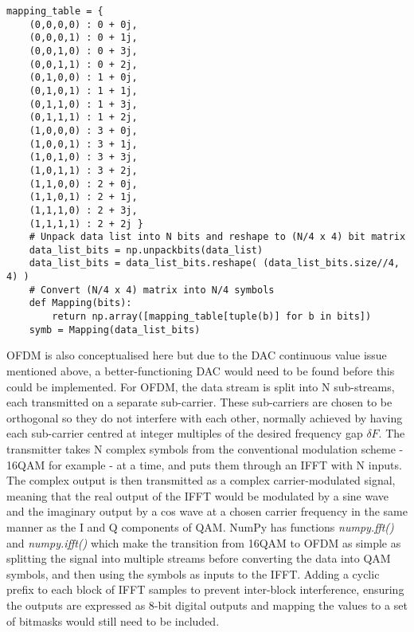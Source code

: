 \documentclass[../main.tex]{subfiles}
\begin{document}
\begin{lstlisting}[caption={Inverted QAM Constellation and its use to encode each byte as two symbols}, label={lst_Inverted QAM}]
	mapping_table = {
	(0,0,0,0) : 0 + 0j,
	(0,0,0,1) : 0 + 1j,
	(0,0,1,0) : 0 + 3j,
	(0,0,1,1) : 0 + 2j,
	(0,1,0,0) : 1 + 0j,
	(0,1,0,1) : 1 + 1j,
	(0,1,1,0) : 1 + 3j,
	(0,1,1,1) : 1 + 2j,
	(1,0,0,0) : 3 + 0j,
	(1,0,0,1) : 3 + 1j,
	(1,0,1,0) : 3 + 3j,
	(1,0,1,1) : 3 + 2j,
	(1,1,0,0) : 2 + 0j,
	(1,1,0,1) : 2 + 1j,
	(1,1,1,0) : 2 + 3j,
	(1,1,1,1) : 2 + 2j }
	# Unpack data list into N bits and reshape to (N/4 x 4) bit matrix
	data_list_bits = np.unpackbits(data_list)
	data_list_bits = data_list_bits.reshape( (data_list_bits.size//4, 4) )
	# Convert (N/4 x 4) matrix into N/4 symbols
	def Mapping(bits):
		return np.array([mapping_table[tuple(b)] for b in bits])
	symb = Mapping(data_list_bits)
\end{lstlisting}

OFDM is also conceptualised here but due to the DAC continuous value issue mentioned above, a better-functioning DAC would need to be found before this could be implemented.
For OFDM, the data stream is split into N sub-streams, each transmitted on a separate sub-carrier.
These sub-carriers are chosen to be orthogonal so they do not interfere with each other, normally achieved by having each sub-carrier centred at integer multiples of the desired frequency gap $\delta F$.
The transmitter takes N complex symbols from the conventional modulation scheme - 16QAM for example - at a time, and puts them through an IFFT  with N inputs.
The complex output is then transmitted as a complex carrier-modulated signal, meaning that the real output of the IFFT would be modulated by a sine wave and the imaginary output by a cos wave at a chosen carrier frequency in the same manner as the I and Q components of QAM.
NumPy has functions \textit{numpy.fft()} and \textit{numpy.ifft()} which make the transition from 16QAM to OFDM as simple as splitting the signal into multiple streams before converting the data into QAM symbols, and then using the symbols as inputs to the IFFT.
Adding a cyclic prefix to each block of IFFT samples to prevent inter-block interference, ensuring the outputs are expressed as 8-bit digital outputs and mapping the values to a set of bitmasks would still need to be included.\\
\end{document}
